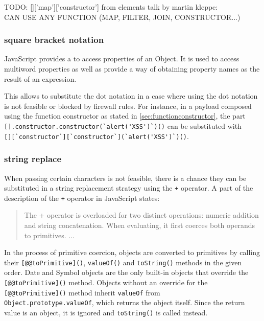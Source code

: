 {\color{red}TODO: []['map']['constructor'] from elements talk by martin kleppe:
\\ CAN USE ANY FUNCTION (MAP, FILTER, JOIN, CONSTRUCTOR...)}

\subsubsection{square bracket notation}
JavaScript provides a  to access properties of an Object. It is used to access multiword properties as well as provide a way of obtaining property names as the result of an expression. \cite{js/brackets}

This  allows to substitute the dot notation in a case where using the dot notation is not feasible or blocked by firewall rules.
For instance, in a payload composed using the function constructor as stated in \ref{sec:functionconstructor}, the part \\ \verb|[].constructor.constructor(`alert('XSS')`)()| can be substituted with \\ \verb|[][`constructor`][`constructor`](`alert('XSS')`)()|.


\subsubsection{string replace}
\label{sec:stringreplace}
When passing certain characters is not feasible, there is a chance they can be substituted in a string replacement strategy using the \verb|+| operator.
A part of the description of the \verb|+| operator in JavaScript states:
\begin{quote}
	The + operator is overloaded for two distinct operations: numeric addition and string concatenation. When evaluating, it first coerces both operands to primitives. ... \cite{js/+}
\end{quote}
In the process of primitive coercion, objects are converted to primitives by calling their \verb|[@@toPrimitive]()|, \verb|valueOf()| and \verb|toString()| methods in the given order. Date and Symbol objects are the only built-in objects that override the \verb|[@@toPrimitive]()| method.
Objects without an override for the \verb|[@@toPrimitive]()| method inherit \verb|valueOf| from
\\ \verb|Object.prototype.valueOf|, which returns the object itself.
Since the return value is an object, it is ignored and \verb|toString()| is called instead. \cite{js/primitiveCoercion}

